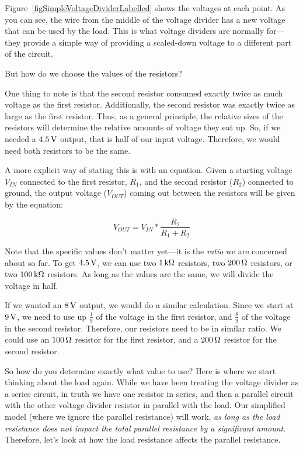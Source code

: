 
Figure~\ref{figSimpleVoltageDividerLabelled} shows the voltages at each point.
As you can see, the wire from the middle of the voltage divider has a new voltage that can be used by the load.
This is what voltage dividers are normally for---they provide a simple way of providing a scaled-down voltage to a different part of the circuit.

But how do we choose the values of the resistors?

One thing to note is that the second resistor consumed exactly twice as much voltage as the first resistor.
Additionally, the second resistor was exactly twice as large as the first resistor.
Thus, as a general principle, the relative sizes of the resistors will determine the relative amounts of voltage they eat up.
So, if we needed a $4.5\,\si{\volt}$ output, that is half of our input voltage.
Therefore, we would need both resistors to be the same.

A more explicit way of stating this is with an equation.
Given a starting voltage $V_{IN}$ connected to the first resistor, $R_1$, and the second resistor ($R_2$) connected to ground, the output voltage ($V_{OUT}$) coming out between the resistors will be given by the equation:

\begin{equation}
V_{OUT} = V_{IN} * \frac{R_2}{R_1 + R_2}
\end{equation}

Note that the specific values don't matter yet---it is the \emph{ratio} we are concerned about so far.
To get $4.5\,\si{\volt}$, we can use two $1\,\si{\kilo\ohm}$ resistors, two $200\,\si{\ohm}$ resistors, or two $100\,\si{\kilo\ohm}$ resistors.
As long as the values are the same, we will divide the voltage in half.

If we wanted an $8\,\si{\volt}$ output, we would do a similar calculation.  
Since we start at $9\,\si{\volt}$, we need to use up $\frac{1}{9}$ of the voltage in the first resistor, and $\frac{8}{9}$ of the voltage in the second resistor.
Therefore, our resistors need to be in similar ratio.
We could use an $100\,\si{\ohm}$ resistor for the first resistor, and a $200\,\si{\ohm}$ resistor for the second resistor.

So how do you determine exactly what value to use?
Here is where we start thinking about the load again.
While we have been treating the voltage divider as a series circuit, in truth we have one resistor in series, and then a parallel circuit with the other voltage divider resistor in parallel with the load.
Our simplified model (where we ignore the parallel resistance) will work, \emph{as long as the load resistance does not impact the total parallel resistance by a significant amount}.
Therefore, let's look at how the load resistance affects the parallel resistance.

